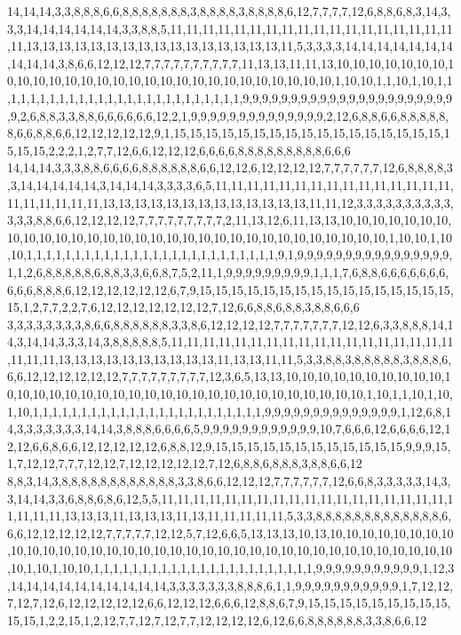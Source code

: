 14,14,14,3,3,8,8,8,6,6,8,8,8,8,8,8,8,3,8,8,8,8,3,8,8,8,8,6,12,7,7,7,7,12,6,8,8,6,8,3,14,3,3,3,14,14,14,14,14,14,3,3,8,8,5,11,11,11,11,11,11,11,11,11,11,11,11,11,11,11,11,11,11,11,13,13,13,13,13,13,13,13,13,13,13,13,13,13,13,13,11,5,3,3,3,3,14,14,14,14,14,14,14,14,14,14,3,8,6,6,12,12,12,7,7,7,7,7,7,7,7,7,7,11,13,13,11,11,13,10,10,10,10,10,10,10,10,10,10,10,10,10,10,10,10,10,10,10,10,10,10,10,10,10,10,10,10,1,10,10,1,1,10,1,10,1,1,1,1,1,1,1,1,1,1,1,1,1,1,1,1,1,1,1,1,1,1,1,1,1,1,9,9,9,9,9,9,9,9,9,9,9,9,9,9,9,9,9,9,9,9,9,9,9,2,6,8,8,3,3,8,8,6,6,6,6,6,6,12,2,1,9,9,9,9,9,9,9,9,9,9,9,9,9,9,2,12,6,8,8,6,6,8,8,8,8,8,8,6,6,8,8,6,6,12,12,12,12,12,9,1,15,15,15,15,15,15,15,15,15,15,15,15,15,15,15,15,15,15,15,15,2,2,2,1,2,7,7,12,6,6,12,12,12,6,6,6,6,8,8,8,8,8,8,8,8,8,6,6,6
14,14,14,3,3,3,8,8,6,6,6,6,8,8,8,8,8,8,6,6,12,12,6,12,12,12,12,7,7,7,7,7,7,12,6,8,8,8,8,3,3,14,14,14,14,14,3,14,14,14,3,3,3,3,6,5,11,11,11,11,11,11,11,11,11,11,11,11,11,11,11,11,11,11,11,11,11,13,13,13,13,13,13,13,13,13,13,13,13,13,11,11,12,3,3,3,3,3,3,3,3,3,3,3,3,3,8,8,6,6,12,12,12,12,7,7,7,7,7,7,7,7,7,2,11,13,12,6,11,13,13,10,10,10,10,10,10,10,10,10,10,10,10,10,10,10,10,10,10,10,10,10,10,10,10,10,10,10,10,10,10,10,1,10,10,1,10,10,1,1,1,1,1,1,1,1,1,1,1,1,1,1,1,1,1,1,1,1,1,1,1,1,1,1,9,1,9,9,9,9,9,9,9,9,9,9,9,9,9,9,9,9,1,1,2,6,8,8,8,8,8,6,8,8,3,3,6,6,8,7,5,2,11,1,9,9,9,9,9,9,9,9,9,1,1,1,7,6,8,8,6,6,6,6,6,6,6,6,6,6,8,8,8,6,12,12,12,12,12,12,6,7,9,15,15,15,15,15,15,15,15,15,15,15,15,15,15,15,15,15,1,2,7,7,2,2,7,6,12,12,12,12,12,12,12,7,12,6,6,8,8,6,8,8,3,8,8,6,6,6
3,3,3,3,3,3,3,3,8,6,6,8,8,8,8,8,8,3,3,8,6,12,12,12,12,7,7,7,7,7,7,7,12,12,6,3,3,8,8,8,14,14,3,14,14,3,3,3,14,3,8,8,8,8,8,5,11,11,11,11,11,11,11,11,11,11,11,11,11,11,11,11,11,11,11,11,11,13,13,13,13,13,13,13,13,13,13,11,13,13,11,11,5,3,3,8,8,3,8,8,8,8,8,3,8,8,8,6,6,6,12,12,12,12,12,12,7,7,7,7,7,7,7,7,7,12,3,6,5,13,13,10,10,10,10,10,10,10,10,10,10,10,10,10,10,10,10,10,10,10,10,10,10,10,10,10,10,10,10,10,10,10,10,10,1,10,1,1,10,1,10,1,10,1,1,1,1,1,1,1,1,1,1,1,1,1,1,1,1,1,1,1,1,1,1,1,1,9,9,9,9,9,9,9,9,9,9,9,9,9,9,1,12,6,8,14,3,3,3,3,3,3,3,14,14,3,8,8,8,6,6,6,6,5,9,9,9,9,9,9,9,9,9,9,9,9,10,7,6,6,6,12,6,6,6,6,12,12,12,6,6,8,6,6,12,12,12,12,12,6,8,8,12,9,15,15,15,15,15,15,15,15,15,15,15,15,9,9,9,15,1,7,12,12,7,7,7,12,12,7,12,12,12,12,12,7,12,6,8,8,6,8,8,8,3,8,8,6,6,12
8,8,3,14,3,8,8,8,8,8,8,8,8,8,8,8,8,3,3,8,6,6,12,12,12,7,7,7,7,7,7,12,6,6,8,3,3,3,3,3,14,3,3,14,14,3,3,6,8,8,6,8,6,12,5,5,11,11,11,11,11,11,11,11,11,11,11,11,11,11,11,11,11,11,11,11,11,11,13,13,13,11,13,13,13,11,13,11,11,11,11,11,5,3,3,8,8,8,8,8,8,8,8,8,8,8,8,8,6,6,6,12,12,12,12,12,7,7,7,7,7,12,12,5,7,12,6,6,5,13,13,13,10,13,10,10,10,10,10,10,10,10,10,10,10,10,10,10,10,10,10,10,10,10,10,10,10,10,10,10,10,10,10,10,10,10,10,10,10,10,10,1,10,1,10,10,1,1,1,1,1,1,1,1,1,1,1,1,1,1,1,1,1,1,1,1,1,1,1,9,9,9,9,9,9,9,9,9,9,9,1,12,3,14,14,14,14,14,14,14,14,14,14,3,3,3,3,3,3,3,8,8,8,6,1,1,9,9,9,9,9,9,9,9,9,9,9,1,7,12,12,7,12,7,12,6,12,12,12,12,12,6,6,12,12,12,6,6,6,12,8,8,6,7,9,15,15,15,15,15,15,15,15,15,15,15,1,2,2,15,1,2,12,7,7,12,7,12,7,7,12,12,12,12,6,12,6,6,8,8,8,8,8,8,3,3,8,6,6,12
